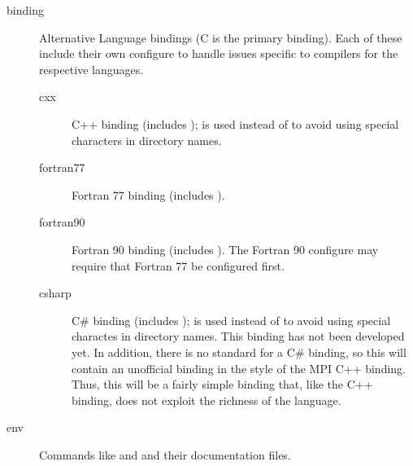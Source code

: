 \documentclass{article}
\begin{document}
\begin{description}
\begin{description}
  \item[binding]Alternative Language bindings (C is the primary
  binding).
        Each of these include their own configure to handle issues
  specific to compilers for the respective languages.
    \begin{description}
    \item[cxx]C++ binding (includes );  is
    used instead of  to avoid using special characters in
    directory names.  
    \item[fortran77]Fortran 77 binding (includes ).
    \item[fortran90]Fortran 90 binding (includes ).
        The Fortran 90 configure may require that Fortran 77 be
  configured first.
    \item[csharp]C\# binding (includes );   is
    used instead of  to avoid using special charactes in
    directory names.  This binding has not been developed yet.  In
    addition, there is no standard for a C\# binding, so this will
    contain an unofficial binding in the style of the MPI C++
    binding.  Thus, this will be a fairly simple binding that, like
    the C++ binding, does not exploit the richness of the language.
    \end{description}
  \item[env]Commands like  and  and their
  documentation files.
  \end{description}
  


\end{description}
\end{document}
